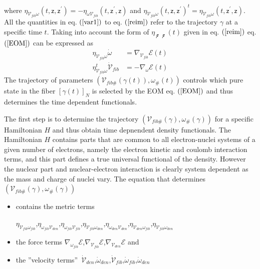 \documentclass[aps,preprint]{revtex4}%
\begin{document}
where $\eta_{\mathcal{V}_{fib}\omega}\left(  t,\mathsf{z},\mathsf{z}^{\prime
}\right)  =-\eta_{\omega\mathcal{V}_{fib}}\left(  t,\mathsf{z}^{\prime
},\mathsf{z}\right)  $ and $\eta_{\mathcal{V}_{fib}\omega}\left(
t,\mathsf{z},\mathsf{z}^{\prime}\right)  ^{t}=\eta_{\mathcal{V}_{fib}\omega
}\left(  t,\mathsf{z}^{\prime},\mathsf{z}\right)  $. All the quantities in eq.
$\left(  \ref{var1}\right)  $ to eq. $\left(  \ref{reim}\right)  $ refer to
the trajectory $\gamma$ at a specific time $t$. Taking into account the form
of $\eta_{\mathbf{\digamma\,\digamma}}(t)$ given in eq. $\left(
\ref{reim}\right)  $ eq. $\left(  \ref{EOM}\right)  $ can be expressed as
\begin{align}
\eta_{\mathcal{V}_{fib}\omega}\dot{\omega}  &  =\nabla_{\mathcal{V}_{fib}%
}\mathcal{E}\left(  t\right) \\
\eta_{\mathcal{V}_{fib}\omega}^{t}\mathcal{\dot{V}}_{fib}  &  =-\nabla
_{\mathcal{\omega}}\mathcal{E}\left(  t\right)
\end{align}
The trajectory of parameters $\left(  \mathcal{V}_{fib\#}(\gamma\left(
t\right)  ),\omega_{\#}\left(  t\right)  \right)  $ controls which pure state
in the fiber $\left[  \gamma\left(  t\right)  \right]  _{N}$ is selected by
the EOM eq. $\left(  \ref{EOM}\right)  $ and thus determines the time
dependent functionals.

The first step is to determine the trajectory $\left(  \mathcal{V}%
_{fib\#}\left(  \gamma\right)  ,\omega_{\#}\left(  \gamma\right)  \right)  $
for a specific Hamiltonian $H$ and thus obtain time depnendent density
functionals. The Hamiltonian $H$ contains parts that are common to all
electron-nuclei systems of a given number of electrons, namely the electron
kinetic and coulomb interaction terms, and this part defines a true universal
functional of the density. However the nuclear part and nuclear-electron
interaction is clearly system dependent as the mass and charge of nuclei vary.
The equation that determines $\left(  \mathcal{V}_{fib\#}\left(
\gamma\right)  ,\omega_{\#}\left(  \gamma\right)  \right)  $

\begin{itemize}
\item contains the metric terms

$\eta_{\mathcal{V}_{fib}\omega_{fib}}$,$\eta_{\mathcal{\omega}_{fib}%
\mathcal{V}_{den}}$,$\eta_{\omega_{fib}\mathcal{V}_{fib}}$,$\eta
_{\mathcal{V}_{fib}\mathcal{\omega}_{den}}$,$\eta_{\omega_{den}\mathcal{V}%
_{den}}$,$\eta_{\mathcal{V}_{den}\omega_{fib}}$,$\eta_{\mathcal{V}_{fib}%
\omega_{den}}$

\item the force terms $\nabla_{\omega_{fib}}\mathcal{E}$,$\nabla
_{\mathcal{V}_{fib}}\mathcal{E}$,$\nabla_{\mathcal{V}_{den}}\mathcal{E}$ and

\item the \textquotedblright velocity terms\textquotedblright\ $\mathcal{\dot
{V}}_{den}$,$\dot{\omega}_{den}$,$\mathcal{\dot{V}}_{fib}$,$\dot{\omega}%
_{fib}$,$\dot{\omega}_{den}$
\end{itemize}
\end{document}

